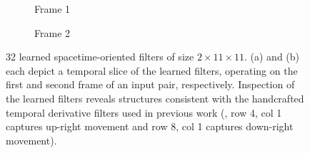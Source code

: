 \begin{figure}
	\centering
	\begin{subfigure}[b]{0.25\textwidth}
		\vspace{-0.45cm}
		\caption{Frame 1}
	\end{subfigure}\hspace{5mm}%
	\begin{subfigure}[b]{0.25\textwidth}
		\vspace{-0.45cm}
		\caption{Frame 2}
	\end{subfigure}
	\caption[Learned spacetime-oriented filters]{32 learned spacetime-oriented filters of size $2 \times 11 \times 11$. (a) and (b) each depict a temporal slice of the learned filters, operating on the first and second frame of an input pair, respectively. Inspection of the learned filters reveals structures consistent with the handcrafted temporal derivative filters used in previous work \cite{derpanis2012spacetime} (\eg, row 4, col 1 captures up-right movement and row 8, col 1 captures down-right movement).}
	\label{fig:filters}
\end{figure}